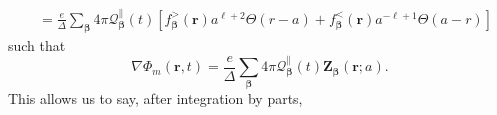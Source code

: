 \documentclass{article}
\begin{document}
\begin{equation}
\begin{split}
&= \frac{e}{\Delta}\sum_{\bm{\beta}}4\pi\mathcal{Q}_{\bm{\beta}}^\parallel(t)\left[f_{\bm{\beta}}^>(\mathbf{r})a^{\ell+2}\Theta(r - a) + f_{\bm{\beta}}^<(\mathbf{r})a^{-\ell + 1}\Theta(a - r)\right]
\end{split}
\end{equation}
such that
\begin{equation}
\nabla\Phi_m(\mathbf{r},t) = \frac{e}{\Delta}\sum_{\bm{\beta}}4\pi\mathcal{Q}_{\bm{\beta}}^\parallel(t)\mathbf{Z}_{\bm{\beta}}(\mathbf{r};a).
\end{equation}
This allows us to say, after integration by parts,
\end{document}
